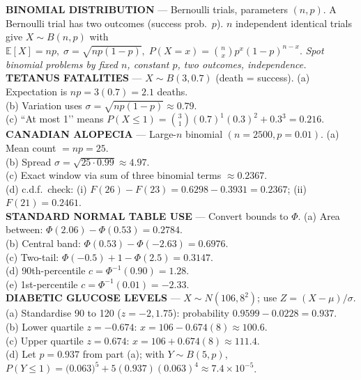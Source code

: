 \documentclass[landscape,0.4pt]{article}
\begin{document}
\begin{multicols*}{6}
\textbf{\tiny{BINOMIAL DISTRIBUTION}} — Bernoulli trials, parameters $(n,p)$.  
A Bernoulli trial has two outcomes (success prob.\ $p$).  $n$ independent identical trials give $X\sim B(n,p)$ with  
$\mathbb E[X]=np,\;\sigma=\sqrt{np(1-p)},\;P(X=x)=\binom{n}{x}p^x(1-p)^{n-x}$.  
\textit{Spot binomial problems by fixed $n$, constant $p$, two outcomes, independence.}\\[-2pt]

\textbf{\tiny{TETANUS FATALITIES}} — $X\sim B(3,0.7)$ (death = success).  
(a) Expectation is $np=3(0.7)=2.1$ deaths.\\
(b) Variation uses $\sigma=\sqrt{np(1-p)}\approx0.79$.\\
(c) “At most 1’’ means $P(X\le1)=\binom31(0.7)^1(0.3)^2+0.3^3=0.216$.\\[-2pt]

\textbf{\tiny{CANADIAN ALOPECIA}} — Large-$n$ binomial $(n=2500,p=0.01)$.  
(a) Mean count $=np=25$.\\
(b) Spread $\sigma=\sqrt{25\cdot0.99}\approx4.97$.\\
(c) Exact window via sum of three binomial terms $\approx0.2367$.\\
(d) c.d.f.\ check: (i) $F(26)-F(23)=0.6298-0.3931=0.2367$; (ii) $F(21)=0.2461$.\\[-2pt]


\textbf{\tiny{STANDARD NORMAL TABLE USE}} — Convert bounds to $\Phi$.  
(a) Area between: $\Phi(2.06)-\Phi(0.53)=0.2784$.\\
(b) Central band: $\Phi(0.53)-\Phi(-2.63)=0.6976$.\\
(c) Two-tail: $\Phi(-0.5)+1-\Phi(2.5)=0.3147$.\\
(d) 90th-percentile $c=\Phi^{-1}(0.90)=1.28$.\\
(e) 1st-percentile $c=\Phi^{-1}(0.01)=-2.33$.\\[-2pt]

\textbf{\tiny{DIABETIC GLUCOSE LEVELS}} — $X\sim N(106,8^2)$; use $Z=(X-\mu)/\sigma$.  
(a) Standardise 90 to 120 ($z=-2,1.75$): probability $0.9599-0.0228=0.937$.\\
(b) Lower quartile $z=-0.674$: $x=106-0.674(8)\approx100.6$.\\
(c) Upper quartile $z=0.674$: $x=106+0.674(8)\approx111.4$.\\
(d) Let $p=0.937$ from part (a); with $Y\sim B(5,p)$, $P(Y\le1)=\bigl(0.063\bigr)^5+5(0.937)(0.063)^4\approx7.4{\times}10^{-5}$.\\[-2pt]
\vspace{-6pt}

\end{multicols*}
\end{document}
